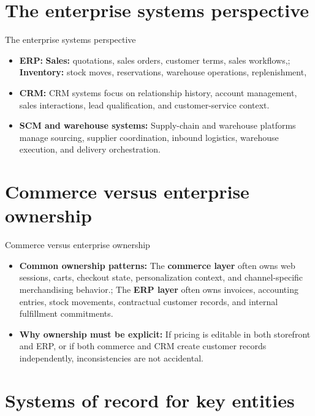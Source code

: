 \documentclass[aspectratio=169]{beamer}
\begin{document}
\section{The enterprise systems perspective}

\begin{frame}{The enterprise systems perspective}
  \begin{itemize}
    \item \textbf{ERP:} \textbf{Sales:} quotations, sales orders, customer terms, sales workflows,; \textbf{Inventory:} stock moves, reservations, warehouse operations, replenishment,
    \item \textbf{CRM:} CRM systems focus on relationship history, account management, sales interactions, lead qualification, and customer-service context.
    \item \textbf{SCM and warehouse systems:} Supply-chain and warehouse platforms manage sourcing, supplier coordination, inbound logistics, warehouse execution, and delivery orchestration.
  \end{itemize}
\end{frame}

\section{Commerce versus enterprise ownership}

\begin{frame}{Commerce versus enterprise ownership}
  \begin{itemize}
    \item \textbf{Common ownership patterns:} The \textbf{commerce layer} often owns web sessions, carts, checkout state, personalization context, and channel-specific merchandising behavior.; The \textbf{ERP layer} often owns invoices, accounting entries, stock movements, contractual customer records, and internal fulfillment commitments.
    \item \textbf{Why ownership must be explicit:} If pricing is editable in both storefront and ERP, or if both commerce and CRM create customer records independently, inconsistencies are not accidental.
  \end{itemize}
\end{frame}

\section{Systems of record for key entities}
\end{document}
